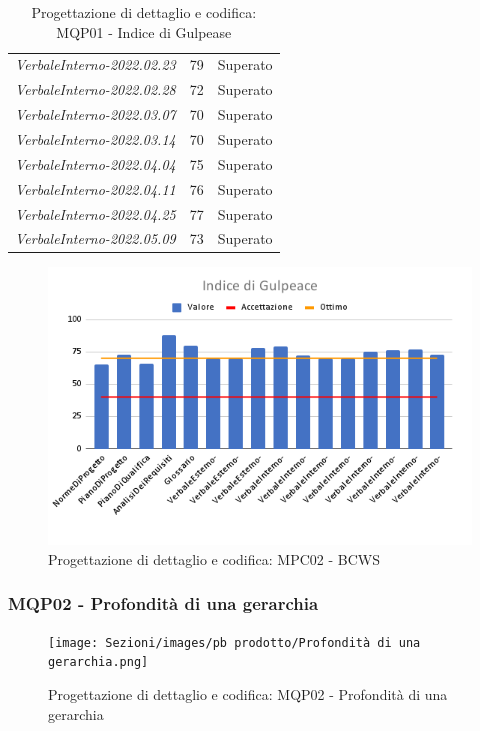 \begin{table}[H]
\begin{tabular}{m{}<{\centering}  m{}<{\centering}  m{}<{\centering} }
            \textit{VerbaleInterno-2022.02.23} &
            79&
            Superato \\
            \textit{VerbaleInterno-2022.02.28} &
            72&
            Superato \\
            \textit{VerbaleInterno-2022.03.07} &
            70&
            Superato \\
            \textit{VerbaleInterno-2022.03.14} &
            70&
            Superato \\
            \textit{VerbaleInterno-2022.04.04} &
            75&
            Superato \\
            \textit{VerbaleInterno-2022.04.11} &
            76&
            Superato \\
            \textit{VerbaleInterno-2022.04.25} &
            77&
            Superato \\
            \textit{VerbaleInterno-2022.05.09} &
            73&
            Superato \\
    \end{tabular}
    \caption{Progettazione di dettaglio e codifica: MQP01 - Indice di Gulpease}
\end{table}
\begin{figure}[H]
    \centering
    \includegraphics[scale=0.50]{Sezioni/images/pb prodotto/Indice di Gulpeace.png}
    \caption{Progettazione di dettaglio e codifica: MPC02 - BCWS}
\end{figure}
\subsubsection{MQP02 - Profondità di una gerarchia}
\begin{figure}[H]
    \centering
    \texttt{[image: Sezioni/images/pb prodotto/Profondità di una gerarchia.png]}
    \caption{Progettazione di dettaglio e codifica: MQP02 - Profondità di una gerarchia}
\end{figure}
